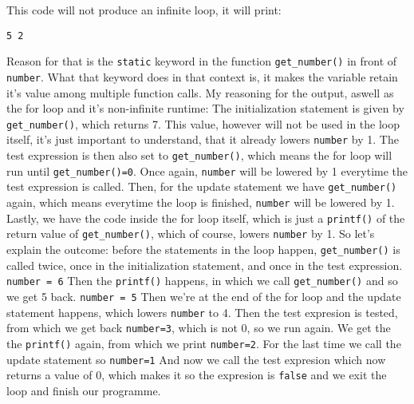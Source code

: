 \documentclass{article}
\begin{document}
\begin{flusleft}
This code will not produce an infinite loop, it will print:
\begin{verbatim}
5 2
\end{verbatim}
Reason for that is the \verb|static| keyword in the function \verb|get_number()| in front of \verb|number|. What that keyword 
does in that context is, it makes the variable retain it's value among multiple function calls. 
My reasoning for the output, aswell as the for loop and it's non-infinite runtime: \newline
The initialization statement is given by \verb|get_number()|, which returns 7. This value, however will
not be used in the loop itself, it's just important to understand, that it already 
lowers \verb|number| by 1. The test expression is then also set to \verb|get_number()|, 
which means the for loop will run until \verb|get_number()=0|.
Once again, \verb|number| will be lowered by 1 everytime the test expression is called. Then, for the 
update statement we have \verb|get_number()| again, which means everytime the loop is finished, 
\verb|number| will be lowered by 1. Lastly, we have the
code inside the for loop itself, which is just a \verb|printf()| of the return value of \verb|get_number()|,
which of course, lowers \verb|number| by 1. \newline
So let's explain the outcome:\newline
before the statements in the loop happen, \verb|get_number()| is called twice, once in the initialization statement,
and once in the test expression. \verb|number = 6| \newline
Then the \verb|printf()| happens, in which we call \verb|get_number()|
and so we get 5 back. \verb|number = 5| \newline
Then we're at the end of the for loop and the update statement happens, which 
lowers \verb|number| to 4. \newline
Then the test expresion is tested, from which we get back \verb|number=3|, which is not 0, so we run again. \newline
We get the the \verb|printf()| again, from which we print \verb|number=2|. \newline
For the last time we call the update statement so \verb|number=1|\newline
And now we call the test expresion which now returns a value of 0, which makes it so the expresion
is \verb|false| and we exit the loop and finish our programme.
\end{flusleft}
\end{document}
